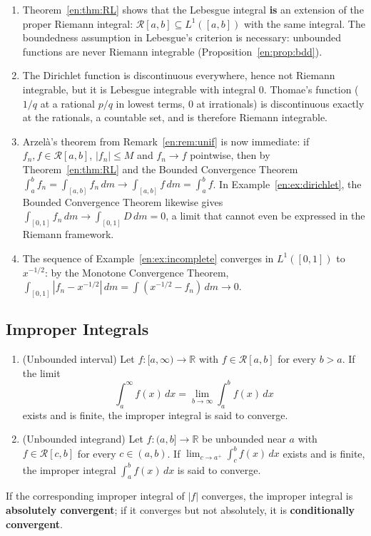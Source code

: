 \documentclass[11pt]{article}
\makeatletter
\newcommand{\envlabel}[1]{\protected@edef\@currentlabel{\themathenv}\label{#1}}
\makeatother
\begin{document}
\begin{remark}\envlabel{en:rem:riemann}
\leavevmode
\begin{enumerate}
  \item Theorem~\ref{en:thm:RL} shows that the Lebesgue integral \textbf{is} an extension of the proper Riemann integral: $\mathcal{R}[a,b]\subseteq L^{1}([a,b])$ with the same integral. The boundedness assumption in Lebesgue's criterion is necessary: unbounded functions are never Riemann integrable (Proposition~\ref{en:prop:bdd}).
  \item The Dirichlet function is discontinuous everywhere, hence not Riemann integrable, but it is Lebesgue integrable with integral $0$. Thomae's function ($1/q$ at a rational $p/q$ in lowest terms, $0$ at irrationals) is discontinuous exactly at the rationals, a countable set, and is therefore Riemann integrable.
  \item Arzelà's theorem from Remark~\ref{en:rem:unif} is now immediate: if $f_{n},f\in\mathcal{R}[a,b]$, $|f_{n}|\leq M$ and $f_{n}\to f$ pointwise, then by Theorem~\ref{en:thm:RL} and the Bounded Convergence Theorem $\int_{a}^{b}f_{n}=\int_{[a,b]}f_{n}\,dm\to\int_{[a,b]}f\,dm=\int_{a}^{b}f$. In Example~\ref{en:ex:dirichlet}, the Bounded Convergence Theorem likewise gives $\int_{[0,1]}f_{n}\,dm\to\int_{[0,1]}D\,dm=0$, a limit that cannot even be expressed in the Riemann framework.
  \item The sequence of Example~\ref{en:ex:incomplete} converges in $L^{1}([0,1])$ to $x^{-1/2}$: by the Monotone Convergence Theorem, $\int_{[0,1]}|f_{n}-x^{-1/2}|\,dm=\int(x^{-1/2}-f_{n})\,dm\to0$.
\end{enumerate}
\end{remark}

\subsection{Improper Integrals}\label{en:sec:improper}

\begin{definition}
\leavevmode
\begin{enumerate}
  \item (Unbounded interval) Let $f:[a,\infty)\to\mathbb{R}$ with $f\in\mathcal{R}[a,b]$ for every $b>a$. If the limit
  \[
  \int_{a}^{\infty}f(x)\,dx=\lim_{b\to\infty}\int_{a}^{b}f(x)\,dx
  \]
  exists and is finite, the improper integral is said to converge.
  \item (Unbounded integrand) Let $f:(a,b]\to\mathbb{R}$ be unbounded near $a$ with $f\in\mathcal{R}[c,b]$ for every $c\in(a,b)$. If $\lim_{c\to a^{+}}\int_{c}^{b}f(x)\,dx$ exists and is finite, the improper integral $\int_{a}^{b}f(x)\,dx$ is said to converge.
\end{enumerate}
If the corresponding improper integral of $|f|$ converges, the improper integral is \textbf{absolutely convergent}; if it converges but not absolutely, it is \textbf{conditionally convergent}.
\end{definition}
\end{document}
